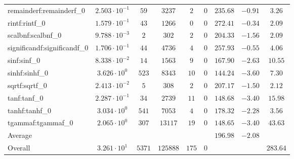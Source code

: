 \begin{tabular}{|l|c|c|c|c|c|c|c|c|}
remainderf:remainderf\_0     & $ 2.503 \cdot 10^{-1} $ & $ 59     $ & $ 3237   $ & $ 2   $ & $ 0   $ & $ 235.68      $ & $ -0.91   $ & $ 3.26    $ \\
rintf:rintf\_0               & $ 1.579 \cdot 10^{-1} $ & $ 43     $ & $ 1266   $ & $ 0   $ & $ 0   $ & $ 272.41      $ & $ -0.34   $ & $ 2.09    $ \\
scalbnf:scalbnf\_0           & $ 9.788 \cdot 10^{-3} $ & $ 2      $ & $ 302    $ & $ 2   $ & $ 0   $ & $ 204.33      $ & $ -1.56   $ & $ 2.09    $ \\
significandf:significandf\_0 & $ 1.706 \cdot 10^{-1} $ & $ 44     $ & $ 4736   $ & $ 4   $ & $ 0   $ & $ 257.93      $ & $ -0.55   $ & $ 4.06    $ \\
sinf:sinf\_0                 & $ 8.338 \cdot 10^{-2} $ & $ 14     $ & $ 1563   $ & $ 9   $ & $ 0   $ & $ 167.90      $ & $ -2.63   $ & $ 10.55   $ \\
sinhf:sinhf\_0               & $ 3.626 \cdot 10^{0}  $ & $ 523    $ & $ 8343   $ & $ 10  $ & $ 0   $ & $ 144.24      $ & $ -3.60   $ & $ 7.30    $ \\
sqrtf:sqrtf\_0               & $ 2.413 \cdot 10^{-2} $ & $ 5      $ & $ 308    $ & $ 2   $ & $ 0   $ & $ 207.17      $ & $ -1.50   $ & $ 2.12    $ \\
tanf:tanf\_0                 & $ 2.287 \cdot 10^{-1} $ & $ 34     $ & $ 2739   $ & $ 11  $ & $ 0   $ & $ 148.68      $ & $ -3.40   $ & $ 15.98   $ \\
tanhf:tanhf\_0               & $ 3.034 \cdot 10^{0}  $ & $ 541    $ & $ 7053   $ & $ 4   $ & $ 0   $ & $ 178.32      $ & $ -2.28   $ & $ 3.56    $ \\
tgammaf:tgammaf\_0           & $ 2.065 \cdot 10^{0}  $ & $ 307    $ & $ 13117  $ & $ 19  $ & $ 0   $ & $ 148.65      $ & $ -3.40   $ & $ 43.63   $ \\
\hline
Average                      & $                     $ & $        $ & $        $ & $     $ & $     $ & $ 196.98      $ & $ -2.08   $ & $         $ \\
\hline
Overall                      & $ 3.261 \cdot 10^{1}  $ & $ 5371   $ & $ 125888 $ & $ 175 $ & $ 0   $ & $             $ & $         $ & $ 283.64  $ \\
\hline
\end{tabular}
